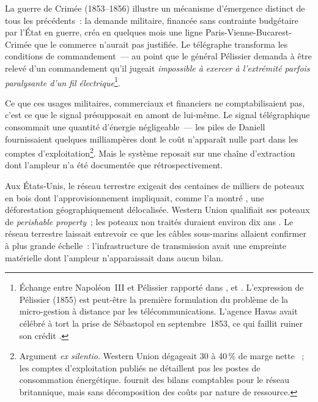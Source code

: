 
La guerre de Crimée (1853--1856) illustre un mécanisme d'émergence distinct de tous les précédents~: la demande militaire, financée sans contrainte budgétaire par l'État en guerre, créa en quelques mois une ligne Paris-Vienne-Bucarest-Crimée que le commerce n'aurait pas justifiée. Le télégraphe transforma les conditions de commandement~--- au point que le général Pélissier demanda à être relevé d'un commandement qu'il jugeait \og \emph{%
impossible à exercer à l'extrémité parfois paralysante d'un fil électrique}\fg{}\footnote{Échange entre Napoléon~III et Pélissier rapporté dans \textcite{frederix_siecle_1959}, \textcite{ducamp_telegraphe_1869} et \textcite[p.~44]{bertho_histoire_1984}. L'expression de Pélissier (1855) est peut-être la première formulation du problème de la micro-gestion à distance par les télécommunications. L'agence Havas avait célébré à tort la prise de Sébastopol en septembre~1853, ce qui faillit ruiner son crédit \parencite{frederix_siecle_1959}.}.

Ce que ces usages militaires, commerciaux et financiers ne comptabilisaient pas, c'est ce que le signal présupposait en amont de lui-même. Le signal télégraphique consommait une quantité d'énergie négligeable~--- les piles de Daniell fournissaient quelques milliampères dont le coût n'apparaît nulle part dans les comptes d'exploitation\footnote{Argument \emph{ex silentio}. Western Union dégageait 30 à 40\,\% de marge nette \parencite{nonnenmacher_telegraph_2001}~; les comptes d'exploitation publiés ne détaillent pas les postes de consommation énergétique. \textcite{kieve_electric_1973} fournit des bilans comptables pour le réseau britannique, mais sans décomposition des coûts par nature de ressource.}. %
Mais le système reposait sur une chaîne d'extraction dont l'ampleur n'a été documentée que rétrospectivement.

%
Aux États-Unis, le réseau terrestre exigeait des centaines de milliers de poteaux en bois dont l'approvisionnement impliquait, comme l'a montré \textcite{fitzmaurice_material_2023}, une déforestation géographiquement délocalisée. Western Union qualifiait ses poteaux de \emph{perishable property}~; les poteaux non traités duraient environ dix ans \parencite{gordon_capital_nineteenth}. Le réseau terrestre laissait entrevoir ce que les câbles sous-marins allaient confirmer à plus grande échelle~: l'infrastructure de transmission avait une empreinte matérielle dont l'ampleur n'apparaissait dans aucun bilan.

